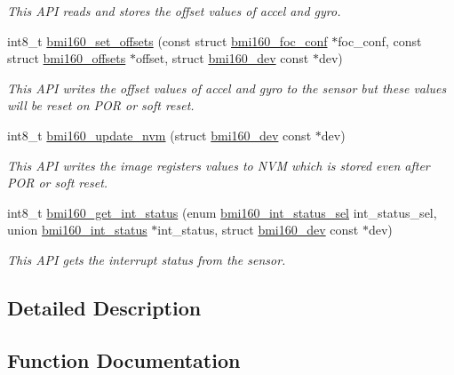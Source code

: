 \begin{DoxyCompactItemize}
\begin{DoxyCompactList}\small\item\em This A\+PI reads and stores the offset values of accel and gyro. \end{DoxyCompactList}\item 
int8\+\_\+t \hyperlink{group__bmi160_gae8fd008b08b8a1fc1aadce8e9ebfc1e6}{bmi160\+\_\+set\+\_\+offsets} (const struct \hyperlink{structbmi160__foc__conf}{bmi160\+\_\+foc\+\_\+conf} $\ast$foc\+\_\+conf, const struct \hyperlink{structbmi160__offsets}{bmi160\+\_\+offsets} $\ast$offset, struct \hyperlink{structbmi160__dev}{bmi160\+\_\+dev} const $\ast$dev)
\begin{DoxyCompactList}\small\item\em This A\+PI writes the offset values of accel and gyro to the sensor but these values will be reset on P\+OR or soft reset. \end{DoxyCompactList}\item 
int8\+\_\+t \hyperlink{group__bmi160_ga273ec1cf6a992e0050ce12f33ee4c070}{bmi160\+\_\+update\+\_\+nvm} (struct \hyperlink{structbmi160__dev}{bmi160\+\_\+dev} const $\ast$dev)
\begin{DoxyCompactList}\small\item\em This A\+PI writes the image registers values to N\+VM which is stored even after P\+OR or soft reset. \end{DoxyCompactList}\item 
int8\+\_\+t \hyperlink{group__bmi160_ga53cb6c4b0f60f54bd49b7ff980e3e1d4}{bmi160\+\_\+get\+\_\+int\+\_\+status} (enum \hyperlink{bmi160__defs_8h_a7b3af5add146ac219291062b4259ac98}{bmi160\+\_\+int\+\_\+status\+\_\+sel} int\+\_\+status\+\_\+sel, union \hyperlink{unionbmi160__int__status}{bmi160\+\_\+int\+\_\+status} $\ast$int\+\_\+status, struct \hyperlink{structbmi160__dev}{bmi160\+\_\+dev} const $\ast$dev)
\begin{DoxyCompactList}\small\item\em This A\+PI gets the interrupt status from the sensor. \end{DoxyCompactList}\end{DoxyCompactItemize}


\subsection{Detailed Description}


\subsection{Function Documentation}
\mbox{\label{group__bmi160_gaf9a909f6c1b3be1b33658b2f17632d35}} 
